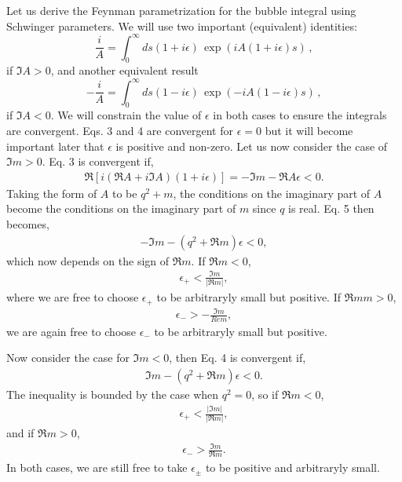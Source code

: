 \documentclass[twoside]{article}
\begin{document}
Let us derive the Feynman parametrization for the bubble integral using Schwinger parameters. We will use two important (equivalent) identities:
\begin{equation}
  \frac{i}{A} = \int_0^\infty ds (1 + i\epsilon)\, \exp(i A (1 + i \epsilon)s)\,,
\end{equation}
if $\Im A >0$, and another equivalent result
\begin{equation}
\label{eq:schwinger2}
-\frac{i}{A} = \int_0^\infty ds (1 - i\epsilon)\, \exp(-i A(1 - i\epsilon) s)\,,
\end{equation}
if $\Im A <0$. We will constrain the value of $\epsilon$ in both cases to ensure the integrals are convergent. Eqs. 3 and 4 are
convergent for $\epsilon = 0$ but it will become important later that $\epsilon$ is positive and non-zero. Let us now consider the case of
$\Im m > 0$. Eq. 3 is convergent if,
\begin{align}
  \Re\left[ i(\Re A + i \Im A)(1 + i\epsilon) \right] = -\Im m - \Re A \epsilon< 0.
\end{align}
Taking the form of $A$ to be $q^2 + m$, the conditions on the imaginary part of $A$ become the conditions on the imaginary part of
$m$ since $q$ is real. Eq. 5 then becomes,
\begin{align}
  -\Im m - (q^2 + \Re m)\epsilon < 0,
\end{align}
which now depends on the sign of $\Re m$. If $\Re m < 0$,
\begin{align}
  \epsilon_{+} < \frac{\Im m}{\lvert \Re m \rvert},
\end{align}
where we are free to choose $\epsilon_+$ to be arbitraryly small but positive. If $\Re m m > 0$,
\begin{align}
  \epsilon_- > -\frac{\Im m}{Re m},
\end{align}
we are again free to choose $\epsilon_-$ to be arbitraryly small but positive.

Now consider the case for $\Im m < 0$, then Eq. 4 is convergent if,
\begin{align}
  \Im m - (q^2 + \Re m)\epsilon < 0.
\end{align}
The inequality is bounded by the case when $q^2 = 0$, so if $\Re m < 0$,
\begin{align}
  \epsilon_+ < \frac{\lvert \Im m\rvert}{\lvert \Re m\rvert},
\end{align}
and if $\Re m > 0$,
\begin{align}
  \epsilon_- > \frac{\Im m}{\Re m}.
\end{align}
In both cases, we are still free to take $\epsilon_{\pm}$ to be positive and arbitraryly small.
\end{document}
